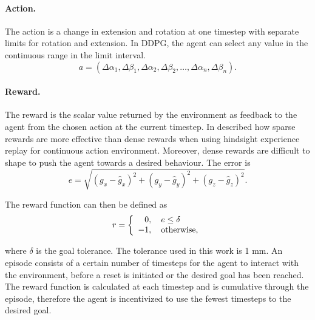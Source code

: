 \paragraph{Action.} The action is a change in extension and rotation at one timestep with separate limits for rotation and extension. In DDPG, the agent can select any value in the continuous range in the limit interval.
\begin{equation}
a = \left( \Delta \alpha_1, \Delta \beta_1, \Delta \alpha_2, \Delta \beta_2,  \dots, \Delta \alpha_n, \Delta \beta_n \right). \label{eqn:action-definition}
\end{equation}

\paragraph{Reward.} The reward is the scalar value returned by the environment as feedback to the agent from the chosen action at the current timestep. In \cite{andrychowicz2017hindsight} described how sparse rewards are more effective than dense rewards when using hindsight experience replay for continuous action environment. Moreover, dense rewards are difficult to shape to push the agent towards a desired behaviour. The error is
\begin{equation}
e = \sqrt{(g_x - \hat{g}_x)^2 + (g_y - \hat{g}_y)^2 + (g_z - \hat{g}_z)^2}. \label{eqn:error}
\end{equation}

The reward function can then be defined as
\begin{equation}
r =
  \left\{
    \begin{array}{l}
      \hphantom{-}0, \quad e \leq \delta \\
      -1, \quad \textnormal{otherwise},
    \end{array}
  \right. \label{eqn:reward}
\end{equation}

where $\delta$ is the goal tolerance. The tolerance used in this work is 1 mm. An episode consists of a certain number of timesteps for the agent to interact with the environment, before a reset is initiated or the desired goal has been reached. The reward function is calculated at each timestep and is cumulative through the episode, therefore the agent is incentivized to use the fewest timesteps to the desired goal.

